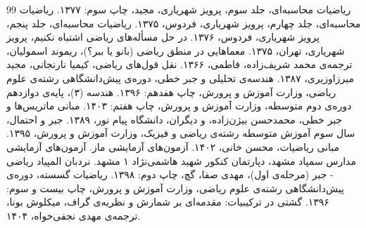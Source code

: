 \begin{thebibliography}{99}
	ریاضیات محاسبه‌ای، جلد سوم، پرویز شهریاری، مجید، چاپ سوم: ۱۳۷۷.
	ریاضیات محاسبه‌ای، جلد چهارم، پرویز شهریاری، فردوس، ۱۳۷۵.
	ریاضیات محاسبه‌ای، جلد پنجم، پرویز شهریاری، فردوس، ۱۳۷۶.
	در حل مسأله‌های ریاضی اشتباه نکنیم، پرویز شهریاری، تهران، ۱۳۷۵.
	معماهایی در منطق ریاضی (بانو یا ببر؟)، ریموند اسمولیان، ترجمه‌ی محمد شریف‌زاده، فاطمی، ۱۳۶۶.
	نقل قول‌های ریاضی، کیمیا نارنجانی، مجید میرزاوزیری، ۱۳۸۷.
	هندسه‌ی تحلیلی و جبر خطی، دوره‌ی پیش‌دانشگاهی رشته‌ی علوم ریاضی، وزارت آموزش و پرورش، چاپ هفدهم: ۱۳۹۶.
	هندسه (۳)، پایه‌ی دوازدهم دوره‌ی دوم متوسطه، وزارت آموزش و پرورش، چاپ هفتم: ۱۴۰۳.
	مبانی ماتریس‌ها و جبر خطی، محمدحسن بیژن‌زاده، و دیگران، دانشگاه پیام نور، ۱۳۸۹.
	جبر و احتمال، سال سوم آموزش متوسطه رشته‌ی ریاضی و فیزیک، وزارت آموزش و پرورش، ۱۳۹۵.
	مبانی ریاضیات، محسن خانی، ۱۴۰۲.
	آزمون‌های آزمایشی ماز.
	آزمون‌های آزمایشی مدارس سمپاد مشهد، دپارتمان کنکور شهید هاشمی‌نژاد ۱ مشهد.
	نردبان المپیاد ریاضی - جبر (مرحله‌ی اول)، مهدی صفا، گچ، چاپ دوم: ۱۳۹۸.
	ریاضیات گسسته، دوره‌ی پیش‌دانشگاهی رشته‌ی علوم ریاضی، وزارت آموزش و پرورش، چاپ بیست و سوم: ۱۳۹۶.
	گشتی در ترکیبیات: مقدمه‌ای بر شمارش و نظریه‌ی گراف، میکلوش بونا، ترجمه‌ی مهدی نجفی‌خواه، ۱۴۰۴.
\end{thebibliography}

